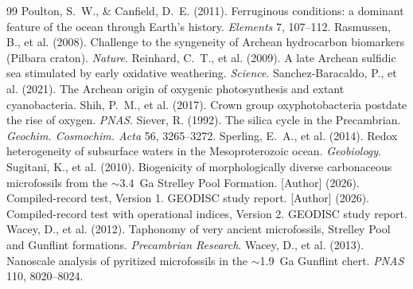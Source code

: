 \documentclass[11pt]{article}
\begin{document}
\begin{thebibliography}{99}
 Poulton, S.~W., \& Canfield, D.~E. (2011).
Ferruginous conditions: a dominant feature of the ocean through Earth's history. \textit{Elements}
7, 107--112.
 Rasmussen, B., et al. (2008). Challenge to the
syngeneity of Archean hydrocarbon biomarkers (Pilbara craton). \textit{Nature}.
 Reinhard, C.~T., et al. (2009). A late Archean sulfidic
sea stimulated by early oxidative weathering. \textit{Science}.
 Sanchez-Baracaldo, P., et al. (2021). The
Archean origin of oxygenic photosynthesis and extant cyanobacteria.
 Shih, P.~M., et al. (2017). Crown group oxyphotobacteria
postdate the rise of oxygen. \textit{PNAS}.
 Siever, R. (1992). The silica cycle in the Precambrian.
\textit{Geochim. Cosmochim. Acta} 56, 3265--3272.
 Sperling, E.~A., et al. (2014). Redox heterogeneity of
subsurface waters in the Mesoproterozoic ocean. \textit{Geobiology}.
 Sugitani, K., et al. (2010). Biogenicity of
morphologically diverse carbonaceous microfossils from the $\sim$3.4~Ga Strelley Pool Formation.
 [Author] (2026). Compiled-record test, Version 1. GEODISC study report.
 [Author] (2026). Compiled-record test with operational indices, Version 2.
GEODISC study report.
 Wacey, D., et al. (2012). Taphonomy of very ancient
microfossils, Strelley Pool and Gunflint formations. \textit{Precambrian Research}.
 Wacey, D., et al. (2013). Nanoscale analysis of pyritized
microfossils in the $\sim$1.9~Ga Gunflint chert. \textit{PNAS} 110, 8020--8024.
\end{thebibliography}
\end{document}
